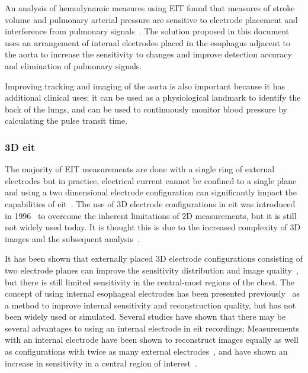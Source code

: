 An analysis of hemodynamic measures using EIT found that measures of stroke 
volume and pulmonary arterial pressure are sensitive to electrode placement and
interference from pulmonary signals~\parencite{Braun2018a}. 
The solution proposed in this document uses an arrangement of internal electrodes placed in the 
esophagus adjacent to the aorta to increase the sensitivity to changes and improve detection 
accuracy and elimination of pulmonary signals.

Improving tracking and imaging of the aorta is also important because it
has additional clinical uses: it  can be used as a physiological landmark to identify
the back of the lungs, and can be used to continuously monitor blood pressure by
calculating the pulse transit time. 

\subsubsection{3D \acrshort{eit}}

The majority of EIT measurements are done with a single ring of external electrodes but 
in practice, electrical current cannot  be confined to a single plane
and using a two dimensional electrode configuration can significantly
impact the capabilities of \acrshort{eit}~\parencite{Rabbani1991}.
The use of 3D electrode configurations in \acrshort{eit}
was introduced in 1996~\parencite{Metherall1996} to overcome the 
inherent limitations of 2D measurements, but it is still not widely used today.
It is thought this is due to the increased complexity of 3D images
and the subsequent analysis~\parencite{Grychtol2019}.

It has been shown that externally placed 3D electrode configurations
consisting of two electrode planes
can improve the sensitivity distribution and image quality~\parencite{Grychtol2016},
but there is still limited sensitivity in the central-most regions 
of the chest.
The concept of using internal esophageal electrodes has been presented
previously~\parencite{Pilkington1989,Schuessler1995}
as a method to improve internal sensitivity 
and reconstruction quality,
but has not been widely used or simulated.
Several studies have shown that there may be several advantages to using an internal
electrode in \acrshort{eit} recordings; 
Measurements with an internal electrode have been 
shown to reconstruct images equally as well as configurations with 
twice as many external electrodes~\parencite{Schuessler1995},
and have shown an increase in sensitivity in a central region 
of interest~\parencite{Kwon2013,Czaplik2014,Farooq2014}.

